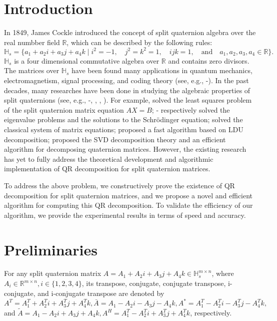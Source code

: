 \documentclass[preprint,12pt]{elsarticle}
\numberwithin{equation}{section}
\begin{document}

\section{Introduction}
In 1849, James Cockle \cite{Cockle1849} introduced the concept of split quaternion algebra over the real numbber field $\mathbb{R}$,   which can be described by the following rules:
\[
\mathbb{H}_s = \{ a_1 + a_2 i + a_3 j + a_4 k \mid i^2 = -1, \quad j^2 = k^2 = 1, \quad ijk = 1, \quad \text{and} \quad a_1, a_2, a_3, a_4 \in \mathbb{R} \}.
\] 
$\mathbb{H}_s$ is a four dimensional commutative algebra over $\mathbb{R}$ and contains zero divisors.  The matrices over $\mathbb{H}_s$ have been found many applications in quantum mechanics, electromagnetism, signal processing, and coding theory (see, e.g., \cite{Hasebe2010}-\cite{Wang2023}). In the past  decades, many researches  have been done in studying the algebraic properties of split quaternions (see, e.g., \cite{Yasemin2012}-\cite{Gang2024}, \cite{wang},  \cite{mma}, \cite{yuan}). For example, \cite{Zhang2015} solved the least squares problem of the split quaternion matrix equation $AX=B$; \cite{Jiang2018}-\cite{TJiang2018} respectively solved the eigenvalue problems and the solutions to the Schrödinger equation; \cite{wang}   solved the classical system of matrix equations; \cite{Wang2021} proposed a fast algorithm based on LDU decomposition; \cite{Gang2024}  proposed the SVD decomposition theory and an efficient algorithm for decomposing quaternion matrices. However, the existing research has yet to fully address the theoretical development and algorithmic implementation of QR decomposition for split quaternion matrices.

To address the above problem, we constructively prove the existence of QR decomposition for split quaternion matrices, and we propose a novel and efficient algorithm for computing this QR decomposition.  To validate the efficiency  of our algorithm, we provide the experimental results in terms of speed and accuracy.

\section{Preliminaries}
For any split quaternion matrix \({A}=A_{1}+A_{2}i + A_{3}j + A_{4}k \in\mathbb{H}_{s}^{m\times n}\), where \(A_{i}\in\mathbb{R}^{m\times n}, i\in\{1,2,3,4\}\), its transpose, conjugate, conjugate transpose, i-conjugate, and i-conjugate transpose are  denoted by 
 \({A}^T = A_1^T + A_2^Ti + A_3^Tj + A_4^Tk,\bar{{A}} = A_1 - A_2i - A_3j - A_4k, {A}^* = A_1^T - A_2^Ti - A_3^Tj - A_4^Tk,\) and \(\tilde{{A}} = A_1 - A_2i + A_3j + A_4k,{A}^H = A_1^T - A_2^Ti + A_3^Tj + A_4^Tk\), respectively.
\end{document}
